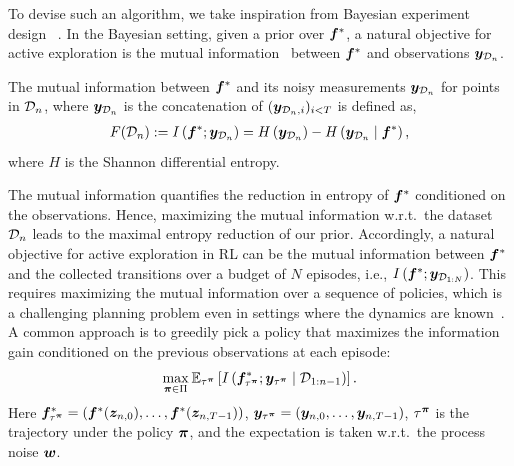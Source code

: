  To devise such an algorithm, we take inspiration from Bayesian experiment design ~\citep{chaloner1995bayesian}. In the Bayesian setting, given a prior over ${\bm{f}}^*$, a natural objective for active exploration is the mutual information~\citep{lidley_info_gain} between ${\bm{f}}^*$ and observations ${\bm{y}}_{{\mathcal{D}}_n}$.
\begin{definition}
\label{def:MI}
The mutual information between ${\bm{f}}^{*}$ and its noisy measurements ${\bm{y}}_{{\mathcal{D}}_n}$ for points in ${\mathcal{D}}_n$, where ${\bm{y}}_{{\mathcal{D}}_n}$ is the concatenation of $({\bm{y}}_{{\mathcal{D}}_n, i})_{i<T}$ is defined as,
\begin{align}
  F({\mathcal{D}}_n) := I \left({{\bm{f}}^{*}}; {{\bm{y}}_{{\mathcal{D}}_n}}\right) = H\left({\bm{y}}_{{\mathcal{D}}_n}\right) - H\left( {\bm{y}}_{{\mathcal{D}}_n}\mid{\bm{f}}^{*}\right),
\end{align}
where $H$ is the Shannon differential entropy. 
\end{definition}
The mutual information quantifies the reduction in entropy of ${\bm{f}}^*$ conditioned on the observations.
Hence, maximizing the mutual information w.r.t.~the dataset ${\mathcal{D}}_{n}$ leads to the maximal entropy reduction of our prior. Accordingly, a natural objective for active exploration in RL can be the mutual information between ${\bm{f}}^*$ and the collected transitions over a budget of $N$ episodes, i.e., $I \left({{\bm{f}}^{*}}; {{\bm{y}}_{{\mathcal{D}}_{1:N}}}\right)$. This requires maximizing the mutual information over a sequence of policies, which is a challenging planning problem even in settings where the dynamics are known~\citep{pmlr-v206-mutny23a}. A common approach is to greedily pick a policy that maximizes the information gain conditioned on the previous observations at each episode:
\begin{equation}
    \underset{{\bm{\pi}} \in \Pi}{\max} \hspace{0.2em} \mathbb{E}_{\tau^{{\bm{\pi}}}}\left[I\left({\bm{f}}^*_{\tau^{{\bm{\pi}}}}; {\bm{y}}_{\tau^{{\bm{\pi}}}} \mid {\mathcal{D}}_{1:n-1}\right)\right].
    \label{eq:greedy_info_gain}
\end{equation}
Here ${\bm{f}}^*_{\tau^{{\bm{\pi}}}} = ({\bm{f}}^*({\bm{z}}_{n, 0}), \ldots, {\bm{f}}^*({\bm{z}}_{n, T-1}))$, ${\bm{y}}_{\tau^{{\bm{\pi}}}} = ({\bm{y}}_{n, 0},\ldots, {\bm{y}}_{n, T-1})$, $\tau^{{\bm{\pi}}}$ is the trajectory under the policy ${\bm{\pi}}$, and the expectation is taken w.r.t.~the process noise ${\bm{w}}$.
